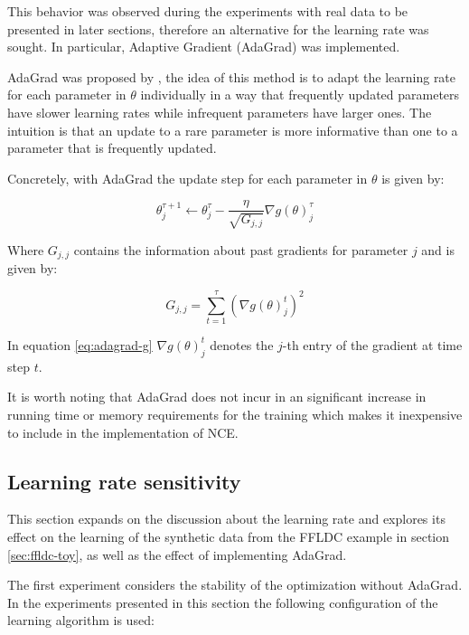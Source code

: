 This behavior was observed during the experiments with real data to be presented in later sections, therefore an alternative for the learning rate was sought. In particular, Adaptive Gradient (AdaGrad) was implemented.

AdaGrad was proposed by \citet{Duchi2011adagrad}, the idea of this method is to adapt the learning rate for each parameter in $\theta$ individually in a way that frequently updated parameters have slower learning rates while infrequent parameters have larger ones. The intuition is that an update to a rare parameter is more informative than one to a parameter that is frequently updated.

Concretely, with AdaGrad the update step for each parameter in $\theta$ is given by:

\begin{equation}
  \theta^{\tau + 1}_{j} \leftarrow \theta^{\tau}_{j} - \frac{\eta}{\sqrt{G_{j,j}}} \nabla g(\theta)^{\tau}_{j}
\end{equation}

Where $G_{j,j}$ contains the information about past gradients for parameter $j$ and is given by:

\begin{equation}
  G_{j,j} = \sum_{t=1}^{\tau} \left(\nabla g(\theta)^{t}_{j}\right)^{2}
  \label{eq:adagrad-g}
\end{equation}

In equation \ref{eq:adagrad-g} $\nabla g(\theta)^{t}_{j}$ denotes the $j$-th entry of the gradient at time step $t$.

It is worth noting that AdaGrad does not incur in an significant increase in running time or memory requirements for the training which makes it inexpensive to include in the implementation of NCE.

\subsection{Learning rate sensitivity}

This section expands on the discussion about the learning rate and explores its effect on the learning of the synthetic data from the FFLDC example in section \ref{sec:ffldc-toy}, as well as the effect of implementing AdaGrad.

The first experiment considers the stability of the optimization without AdaGrad. In the experiments presented in this section the following configuration of the learning algorithm is used:

